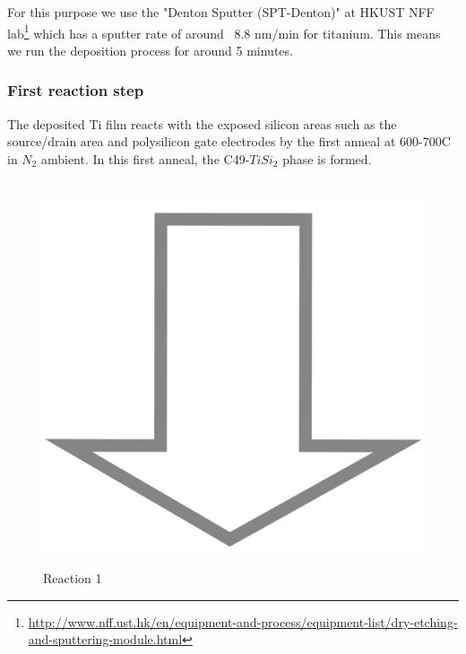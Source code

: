 For this purpose we use the "Denton Sputter (SPT-Denton)" at HKUST NFF lab\footnote{\url{http://www.nff.ust.hk/en/equipment-and-process/equipment-list/dry-etching-and-sputtering-module.html}} which has a sputter rate of around ~8.8 nm/min for titanium.
This means we run the deposition process for around 5 minutes.

\subsubsection{First reaction step}

The deposited Ti film reacts with the exposed silicon areas such as the source/drain area and polysilicon gate electrodes by the first anneal at 600-700\degree C in $N_2$ ambient.
In this first anneal, the C49-$TiSi_2$ phase is formed.

\begin{figure}[H]
	\centering
	\begin{tikzpicture}[node distance = 3cm, auto, thick,scale=\CrossSectionOnly, every node/.style={transform shape}]
		
	\end{tikzpicture}\\
	\includegraphics[scale=0.01]{down_arrow.png}\\
	\begin{tikzpicture}[node distance = 3cm, auto, thick,scale=\CrossSectionOnly, every node/.style={transform shape}]
		
	\end{tikzpicture}
	\caption{Reaction 1}
\end{figure}

